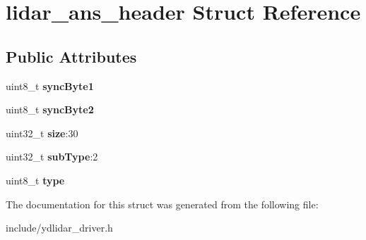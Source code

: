 \hypertarget{structlidar__ans__header}{}\section{lidar\+\_\+ans\+\_\+header Struct Reference}
\label{structlidar__ans__header}
\subsection*{Public Attributes}
\begin{DoxyCompactItemize}
\item 
uint8\+\_\+t {\bfseries sync\+Byte1}\hypertarget{structlidar__ans__header_aeaa5beb7182c922d6d68697ecf60318a}{}\label{structlidar__ans__header_aeaa5beb7182c922d6d68697ecf60318a}

\item 
uint8\+\_\+t {\bfseries sync\+Byte2}\hypertarget{structlidar__ans__header_a9ce80818478513e1cb36de5a17917958}{}\label{structlidar__ans__header_a9ce80818478513e1cb36de5a17917958}

\item 
uint32\+\_\+t {\bfseries size}\+:30\hypertarget{structlidar__ans__header_a6e01bc2ec02153e40f3402790b917af3}{}\label{structlidar__ans__header_a6e01bc2ec02153e40f3402790b917af3}

\item 
uint32\+\_\+t {\bfseries sub\+Type}\+:2\hypertarget{structlidar__ans__header_abd31cd42537cebe7958b95d3f4a07169}{}\label{structlidar__ans__header_abd31cd42537cebe7958b95d3f4a07169}

\item 
uint8\+\_\+t {\bfseries type}\hypertarget{structlidar__ans__header_aab38102a1a266b5bfb842b10bf2804b2}{}\label{structlidar__ans__header_aab38102a1a266b5bfb842b10bf2804b2}

\end{DoxyCompactItemize}


The documentation for this struct was generated from the following file\+:\begin{DoxyCompactItemize}
\item 
include/ydlidar\+\_\+driver.\+h\end{DoxyCompactItemize}
